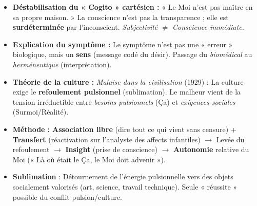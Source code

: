 \documentclass[11pt]{article}
\begin{document}
\begin{aretenir}
\begin{itemize}
    \item \textbf{Déstabilisation du « Cogito » cartésien :} « Le Moi n'est pas maître en sa propre maison. » La conscience n'est pas la transparence ; elle est \textbf{surdéterminée} par l'inconscient. \emph{Subjectivité $\neq$ Conscience immédiate.}
    \item \textbf{Explication du symptôme :} Le symptôme n'est pas une « erreur » biologique, mais un \textbf{sens} (message codé du désir). Passage du \emph{biomédical} au \emph{herméneutique} (interprétation).
    \item \textbf{Théorie de la culture :} \emph{Malaise dans la civilisation} (1929) : La culture exige le \textbf{refoulement pulsionnel} (sublimation). Le malheur vient de la tension irréductible entre \emph{besoins pulsionnels} (Ça) et \emph{exigences sociales} (Surmoi/Réalité).
    \item \textbf{Méthode :} \textbf{Association libre} (dire tout ce qui vient sans censure) + \textbf{Transfert} (réactivation sur l'analyste des affects infantiles) $\rightarrow$ Levée du refoulement $\rightarrow$ \textbf{Insight} (prise de conscience) $\rightarrow$ \textbf{Autonomie} relative du Moi (« Là où était le Ça, le Moi doit advenir »).
    \item \textbf{Sublimation} : Détournement de l'énergie pulsionnelle vers des objets socialement valorisés (art, science, travail technique). Seule « réussite » possible du conflit pulsion/culture.
\end{itemize}
\end{aretenir}
\end{document}
